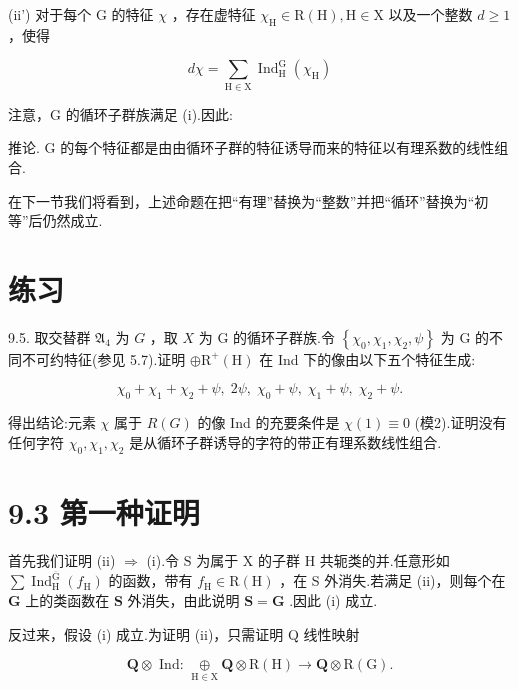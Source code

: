 \documentclass[10pt]{article}
\begin{document}
(ii’) 对于每个 \(\mathrm{G}\) 的特征 \(\chi\) ，存在虚特征 \({\chi }_{\mathrm{H}} \in  \mathrm{R}\left( \mathrm{H}\right) ,\mathrm{H} \in  \mathrm{X}\) 以及一个整数 \(d \geq  1\) ，使得

\[
{d\chi } = \mathop{\sum }\limits_{{\mathrm{H} \in  \mathrm{X}}}{\operatorname{Ind}}_{\mathrm{H}}^{\mathrm{G}}\left( {\chi }_{\mathrm{H}}\right)
\]

注意，G 的循环子群族满足 (i).因此:

推论. \(\mathrm{G}\) 的每个特征都是由由循环子群的特征诱导而来的特征以有理系数的线性组合.

在下一节我们将看到，上述命题在把“有理”替换为“整数”并把“循环”替换为“初等”后仍然成立.

\section*{练习}

9.5. 取交替群 \({\mathfrak{A}}_{4}\) 为 \(G\) ，取 \(X\) 为 G 的循环子群族.令 \(\left\{  {{\chi }_{0},{\chi }_{1},{\chi }_{2},\psi }\right\}\) 为 G 的不同不可约特征(参见 5.7).证明 \(\oplus  {\mathrm{R}}^{ + }\left( \mathrm{H}\right)\) 在 Ind 下的像由以下五个特征生成:

\[
{\chi }_{0} + {\chi }_{1} + {\chi }_{2} + \psi ,\;{2\psi },\;{\chi }_{0} + \psi ,\;{\chi }_{1} + \psi ,\;{\chi }_{2} + \psi .
\]

得出结论:元素 \(\chi\) 属于 \(R\left( G\right)\) 的像 Ind 的充要条件是 \(\chi \left( 1\right)  \equiv  0\) (模2).证明没有任何字符 \({\chi }_{0},{\chi }_{1},{\chi }_{2}\) 是从循环子群诱导的字符的带正有理系数线性组合.

\section*{9.3 第一种证明}

首先我们证明 (ii) \(\Rightarrow\) (i).令 \(\mathrm{S}\) 为属于 \(\mathrm{X}\) 的子群 \(\mathrm{H}\) 共轭类的并.任意形如 \(\sum {\operatorname{Ind}}_{\mathrm{H}}^{\overline{\mathrm{G}}}\left( {f}_{\mathrm{H}}\right)\) 的函数，带有 \({f}_{\mathrm{H}} \in  \mathrm{R}\left( \mathrm{H}\right)\) ，在 S 外消失.若满足 (ii)，则每个在 \(\mathbf{G}\) 上的类函数在 \(\mathbf{S}\) 外消失，由此说明 \(\mathbf{S} = \mathbf{G}\) .因此 (i) 成立.

反过来，假设 (i) 成立.为证明 (ii)，只需证明 Q 线性映射

\[
\mathbf{Q} \otimes  \text{ Ind: }\underset{\mathrm{H} \in  \mathrm{X}}{ \oplus  }\mathbf{Q} \otimes  \mathrm{R}\left( \mathrm{H}\right)  \rightarrow  \mathbf{Q} \otimes  \mathrm{R}\left( \mathrm{G}\right) .
\]
\end{document}
